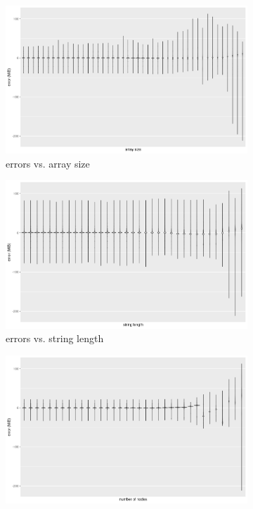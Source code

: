 \documentclass{article}
\begin{document}
\begin{figure}
\begin{subfigure}[t]{0.49\textwidth}
    \includegraphics[width=\textwidth]{../local_experiments/io_memory_tests/plots/prediction_violin_array_size.png}
    \caption{errors vs. array size}
  \end{subfigure}
  \begin{subfigure}[t]{0.49\textwidth}
    \centering
    \includegraphics[width=\textwidth]{../local_experiments/io_memory_tests/plots/prediction_violin_string_length.png}
    \caption{errors vs. string length}
    \label{fig:prediction_violin_b}
  \end{subfigure}
  \begin{subfigure}[t]{0.49\textwidth}
    \centering
    \includegraphics[width=\textwidth]{../local_experiments/io_memory_tests/plots/prediction_violin_num_nodes.png}

\end{subfigure}
\end{figure}
\end{document}
